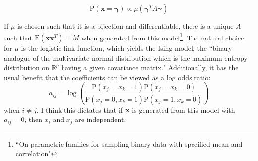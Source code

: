 \documentclass[11pt]{article}
\newcommand{\R}{\mathbb{R}}
\newcommand{\p}{\mathrm{P}}
\newcommand{\E}{\mathrm{E}}
\theoremstyle{definition}
\begin{document}
    \[ \p(\mathbf x=\mathbf \gamma) \propto \mu(\mathbf{\gamma}^T A\mathbf \gamma)\]

    If $\mu$ is chosen such that it is a bijection and differentiable, there is a unique $A$ such that $\E(\mathbf x \mathbf x^T)=M$ when generated from this model\footnote{``On parametric families for sampling binary data with specified mean and correlation"}. The natural choice for $\mu$ is the logistic link function, which yields the Ising model, the ``binary analogue of the multivariate normal distribution which is the maximum entropy distribution on $\R^p$ having a given covariance matrix." Additionally, it has the usual benefit that the coefficients can be viewed as a log odds ratio:
    \[a_{ij} = \log\left(\frac{\p(x_j=x_k=1)\p(x_j=x_k=0)}{\p(x_j=0,x_k=1)\p(x_j=1,x_k=0)}\right) \]
    when $i\neq j$. I think this dictates that if $\bf x$ is generated from this model with $a_{ij}=0$, then $x_i$ and $x_j$ are independent.  \par
\end{document}
